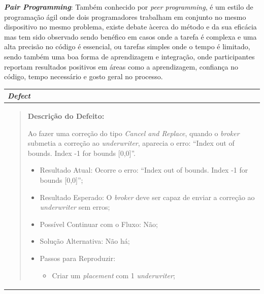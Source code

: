             \textbf{\textit{Pair Programming}}: Também conhecido por \textit{peer programming}, é um estilo de programação ágil onde dois programadores trabalham em conjunto no mesmo dispositivo no mesmo problema\cite{peer-programming}, existe debate àcerca do método e da sua eficácia mas tem sido observado sendo benéfico em casos onde a tarefa é complexa e uma alta precisão no código é essencial, ou tarefas simples onde o tempo é limitado, sendo também uma boa forma de aprendizagem e integração, onde participantes reportam resultados positivos em áreas como a aprendizagem, confiança no código, tempo necessário e gosto geral no processo\cite{faja2014evaluating,hannay2009effectiveness}. %

            \begin{table}[htbp] %
                \centering
                \begin{tabularx}{1\textwidth}{|>{\raggedright\arraybackslash}X|}
                    \hline
                    \rowcolor{lightgray}
                    \textbf{\textit{Defect}} \\
                    \hline
                    \rowcolor{lightgray!20}
                  
                    \begin{quote}
                        \textbf{Descrição do Defeito:}

                        Ao fazer uma correção do tipo \textit{Cancel and Replace}, quando o \textit{broker} submetia a correção ao \textit{underwriter}, aparecia o erro: ``Index out of bounds. Index -1 for bounds [0,0]''.
                        
                        \begin{itemize}
                            \item Resultado Atual: Ocorre o erro: ``Index out of bounds. Index -1 for bounds [0,0]'';

                            \item Resultado Esperado: O \textit{broker} deve ser capaz de enviar a correção ao \textit{underwriter} sem erros;

                            \item Possível Continuar com o Fluxo: Não;

                            \item Solução Alternativa: Não há;

                            \item Passos para Reproduzir:
                            \begin{itemize}
                                \item Criar um \textit{placement} com 1 \textit{underwriter};


\end{itemize}
\end{itemize}
\end{quote}
\end{tabularx}
\end{table}
